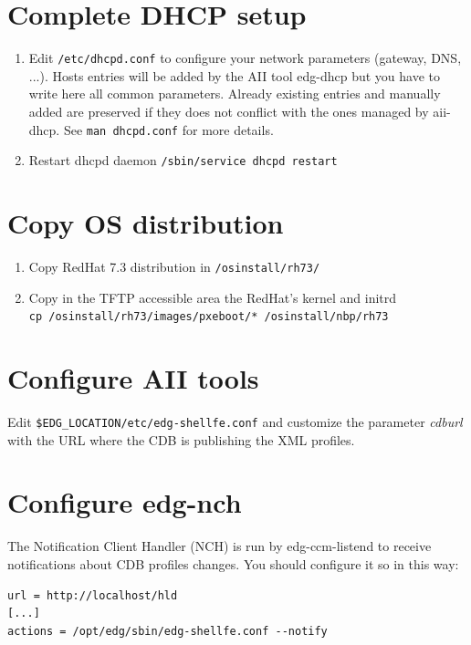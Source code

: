 \documentclass{datagridreport}
\begin{document}
\section{Complete DHCP setup}
\begin{enumerate}
\item Edit \texttt{/etc/dhcpd.conf} to configure your network parameters (gateway, DNS, ...).
Hosts entries will be added by the AII tool edg-dhcp but you have to write here all common parameters.
Already existing entries and manually added are preserved if they does not conflict with
the ones managed by aii-dhcp. See \texttt{man dhcpd.conf} for more details.
\item Restart dhcpd daemon \texttt{/sbin/service dhcpd restart}
\end{enumerate}

\section{Copy OS distribution}
\begin{enumerate}
\item Copy RedHat 7.3 distribution in \texttt{/osinstall/rh73/}
\item Copy in the TFTP accessible area the RedHat's kernel and initrd\\
\texttt{cp /osinstall/rh73/images/pxeboot/* /osinstall/nbp/rh73}
\end{enumerate}

\section{Configure AII tools} \label{confaii}
Edit \texttt{\$EDG\_LOCATION/etc/edg-shellfe.conf} and customize the parameter \emph{cdburl}
with the URL where the CDB is publishing the XML profiles.

\section{Configure edg-nch} \label{nch}
The Notification Client Handler (NCH) is run by edg-ccm-listend to receive notifications
about CDB profiles changes. You should configure it so in this way:
\begin{verbatim}
url = http://localhost/hld
[...]
actions = /opt/edg/sbin/edg-shellfe.conf --notify
\end{verbatim}
\end{document}
